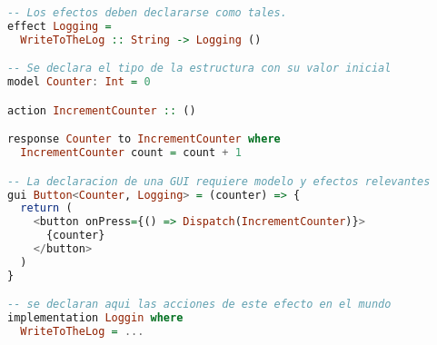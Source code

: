 \documentclass[12pt]{article}
\begin{document}
\begin{lstlisting}[language=Haskell]
-- Los efectos deben declararse como tales.
effect Logging =
  WriteToTheLog :: String -> Logging ()

-- Se declara el tipo de la estructura con su valor inicial
model Counter: Int = 0

action IncrementCounter :: ()

response Counter to IncrementCounter where
  IncrementCounter count = count + 1

-- La declaracion de una GUI requiere modelo y efectos relevantes
gui Button<Counter, Logging> = (counter) => {
  return (
    <button onPress={() => Dispatch(IncrementCounter)}>
      {counter}
    </button>
  )
}

-- se declaran aqui las acciones de este efecto en el mundo
implementation Loggin where
  WriteToTheLog = ...
\end{lstlisting}


\printbibliography{}
\end{document}
